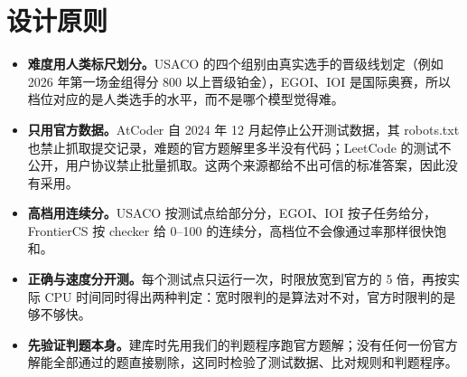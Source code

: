 \documentclass[11pt,a4paper,fontset=none]{ctexart}
\begin{document}
\section{设计原则}
\begin{itemize}
  \item \textbf{难度用人类标尺划分。}USACO 的四个组别由真实选手的晋级线划定（例如 2026 年第一场金组得分 800 以上晋级铂金），EGOI、IOI 是国际奥赛，所以档位对应的是人类选手的水平，而不是哪个模型觉得难。
  \item \textbf{只用官方数据。}AtCoder 自 2024 年 12 月起停止公开测试数据，其 robots.txt 也禁止抓取提交记录，难题的官方题解里多半没有代码；LeetCode 的测试不公开，用户协议禁止批量抓取。这两个来源都给不出可信的标准答案，因此没有采用。
  \item \textbf{高档用连续分。}USACO 按测试点给部分分，EGOI、IOI 按子任务给分，FrontierCS 按 checker 给 0--100 的连续分，高档位不会像通过率那样很快饱和。
  \item \textbf{正确与速度分开测。}每个测试点只运行一次，时限放宽到官方的 5 倍，再按实际 CPU 时间同时得出两种判定：宽时限判的是算法对不对，官方时限判的是够不够快。
  \item \textbf{先验证判题本身。}建库时先用我们的判题程序跑官方题解；没有任何一份官方解能全部通过的题直接剔除，这同时检验了测试数据、比对规则和判题程序。
\end{itemize}
\end{document}
